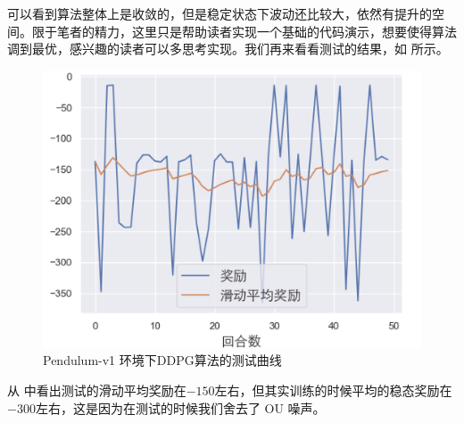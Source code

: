 可以看到算法整体上是收敛的，但是稳定状态下波动还比较大，依然有提升的空间。限于笔者的精力，这里只是帮助读者实现一个基础的代码演示，想要使得算法调到最优，感兴趣的读者可以多思考实现。我们再来看看测试的结果，如 所示。

\begin{figure}[htb]
    \centering
    \includegraphics[width=0.6\linewidth]{res/ch12/assets/eval_rewards_curve_cn-1760950.png}
    \caption{Pendulum-v1 环境下DDPG算法的测试曲线}
    \label{fig:eval_rewards_curve_cn-1760950}
\end{figure}

从 中看出测试的滑动平均奖励在$-150$左右，但其实训练的时候平均的稳态奖励在$-300$左右，这是因为在测试的时候我们舍去了 OU 噪声。
